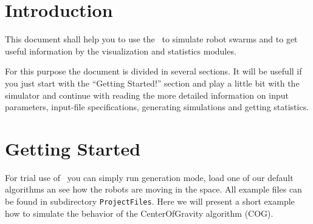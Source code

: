 \documentclass[a4paper,halfparskip,11pt,twoside]{scrartcl}
\begin{document}
\init{}


\section{Introduction}
This document shall help you to use the \RSS\ to simulate robot swarms and to get useful information by the visualization and statistics modules.

For this purpose the document is divided in several sections. It will be usefull if you just start with the ``Getting Started!'' section and play a little bit with the simulator and continue with reading the more detailed information on input parameters, input-file specifications, generating simulations and getting statistics.


\section{Getting Started}
For trial use of \RSS\ you can simply run generation mode, load one of our default algorithms an see how the robots are moving in the space. All example files can be found in subdirectory {\tt ProjectFiles}. Here we will present a short example how to simulate the behavior of the {\sc CenterOfGravity} algorithm (COG).
\end{document}
